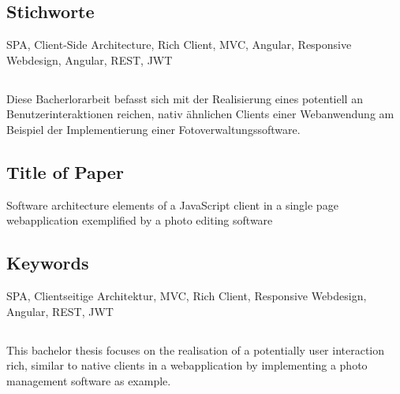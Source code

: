 \subsection*{Stichworte}
SPA, Client-Side Architecture, Rich Client, MVC, Angular, Responsive Webdesign, Angular, REST, JWT


\subsection*{\centering\abstractname}
Diese Bacherlorarbeit befasst sich mit der Realisierung eines potentiell an Benutzerinteraktionen reichen, nativ ähnlichen Clients einer Webanwendung am Beispiel der Implementierung einer Fotoverwaltungssoftware.

\subsection*{Title of Paper}
Software architecture elements of a JavaScript client in a single page webapplication exemplified by a photo editing software

\subsection*{Keywords}
SPA, Clientseitige Architektur, MVC, Rich Client, Responsive Webdesign,
Angular, REST, JWT

\subsection*{\centering\abstractname}
This bachelor thesis focuses on the realisation of a potentially user interaction rich, similar to native clients in a webapplication by implementing a photo management software as example.

\newpage


\tableofcontents %
\newpage









\appendix

\printglossaries


\listoffigures %
\listoflistings %

